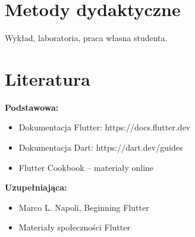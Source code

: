 \documentclass[12pt, a4paper]{article}
\begin{document}
\section{Metody dydaktyczne}

Wykład, laboratoria, praca własna studenta.

\section{Literatura}

\textbf{Podstawowa:}
\begin{itemize}
  \item Dokumentacja Flutter: https://docs.flutter.dev
  \item Dokumentacja Dart: https://dart.dev/guides
  \item Flutter Cookbook – materiały online
\end{itemize}

\textbf{Uzupełniająca:}
\begin{itemize}
  \item Marco L. Napoli, Beginning Flutter
  \item Materiały społeczności Flutter
\end{itemize}
\end{document}
